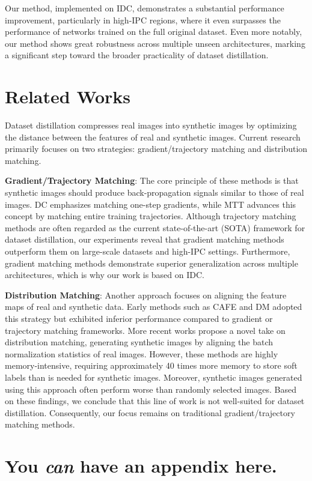 \documentclass{article}
\theoremstyle{plain}
\theoremstyle{definition}
\theoremstyle{remark}
\begin{document}
Our method, implemented on IDC, demonstrates a substantial performance improvement, particularly in high-IPC regions, where it even surpasses the performance of networks trained on the full original dataset. Even more notably, our method shows great robustness across multiple unseen architectures, marking a significant step toward the broader practicality of dataset distillation.


\section{Related Works}
Dataset distillation compresses real images into synthetic images by optimizing the distance between the features of real and synthetic images. Current research primarily focuses on two strategies: gradient/trajectory matching and distribution matching.

\textbf{Gradient/Trajectory Matching}: The core principle of these methods is that synthetic images should produce back-propagation signals similar to those of real images. DC emphasizes matching one-step gradients, while MTT advances this concept by matching entire training trajectories. Although trajectory matching methods are often regarded as the current state-of-the-art (SOTA) framework for dataset distillation, our experiments reveal that gradient matching methods outperform them on large-scale datasets and high-IPC settings. Furthermore, gradient matching methods demonstrate superior generalization across multiple architectures, which is why our work is based on IDC.

\textbf{Distribution Matching}: Another approach focuses on aligning the feature maps of real and synthetic data. Early methods such as CAFE and DM adopted this strategy but exhibited inferior performance compared to gradient or trajectory matching frameworks. More recent works propose a novel take on distribution matching, generating synthetic images by aligning the batch normalization statistics of real images. However, these methods are highly memory-intensive, requiring approximately 40 times more memory to store soft labels than is needed for synthetic images. Moreover, synthetic images generated using this approach often perform worse than randomly selected images. Based on these findings, we conclude that this line of work is not well-suited for dataset distillation. Consequently, our focus remains on traditional gradient/trajectory matching methods.





\newpage
\appendix
\onecolumn
\section{You \emph{can} have an appendix here.}

\end{document}
